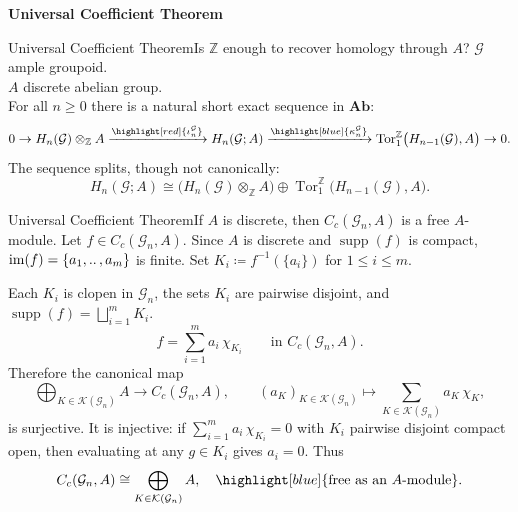 \documentclass[aspectratio=169]{beamer}
\renewcommand{\ldots}{
  \mathinner{{\ldotp}{\ldotp}}
}
\newcommand{\G}{\mathcal{G}}
\newcommand{\ZZ}{\mathbb{Z}}
\newcommand{\supp}{\operatorname{supp}}
\begin{document}
\begin{frame}[plain,c]
  \begin{center}
    \Huge \textbf{Universal Coefficient Theorem}
  \end{center}
\end{frame}

\begin{frame}{Universal Coefficient Theorem}{Is \(\ZZ\) enough to recover homology through \(A\)?}
  \(\G\) ample groupoid.\\
  \(A\) discrete abelian group.\\\pause
  For all \(n\ge 0\) there is a natural short exact sequence in \(\mathbf{Ab}\):
  \[
    0
    \to H_n(\G)\otimes_{\ZZ} A
    \xrightarrow{\highlight[red]{\iota_n^{\G}}}
    H_n(\G;A)
    \xrightarrow{\highlight[blue]{\kappa_n^{\G}}}
    \operatorname{Tor}_1^{\ZZ}\bigl(H_{n-1}(\G),A\bigr)
    \to 0.
  \]
  The sequence splits, though not canonically:
  \[
    H_n(\G;A)
    \cong
    \bigl(H_n(\G)\otimes_{\ZZ} A\bigr)
    \oplus
    \operatorname{Tor}_1^{\ZZ}\bigl(H_{n-1}(\G),A\bigr).
  \]
\end{frame}

\begin{frame}{Universal Coefficient Theorem}{If \(A\) is discrete, then \(C_c(\G_n,A)\) is a free \(A\)-module.}
  Let \(f\in C_c(\G_n,A)\). Since \(A\) is discrete and \(\supp(f)\) is compact, \(\operatorname{im}(f)=\{a_1,\ldots,a_m\}\) is finite.
  Set \(K_i\coloneqq f^{-1}(\{a_i\})\) for \(1\le i\le m\).\pause
  
  Each \(K_i\) is clopen in \(\G_n\), the sets \(K_i\) are pairwise disjoint, and \(\supp(f)=\bigsqcup_{i=1}^m K_i\).
  \[
    f=\sum_{i=1}^m a_i\,\chi_{K_i}\qquad\text{in }C_c(\G_n,A).
  \]
  \pause
  Therefore the canonical map
  \[
    \bigoplus_{K\in \mathcal{K}(\G_n)} A \longrightarrow C_c(\G_n,A),
    \qquad
    (a_K)_{K\in \mathcal{K}(\G_n)}\longmapsto \sum_{K\in \mathcal{K}(\G_n)} a_K\,\chi_K,
  \]
  is surjective.
  It is injective: if \(\sum_{i=1}^m a_i\,\chi_{K_i}=0\) with \(K_i\) pairwise disjoint compact open, then evaluating at any \(g\in K_i\) gives \(a_i=0\).
  Thus
  \[
    C_c(\G_n,A)\cong \bigoplus_{K\in \mathcal{K}(\G_n)} A,
    \quad \highlight[blue]{\text{free as an \(A\)\nobreakdash-module}}.
  \]
\end{frame}
\end{document}
